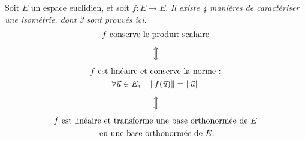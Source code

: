 \begin{thm}
	Soit $E$\/ un espace euclidien, et soit $f : E \to E$.
	\textsl{Il existe 4 manières de caractériser une isométrie, dont 3 sont prouvés ici.}
	\begin{gather*}
		f \text{ conserve le produit scalaire}\\[-2.5mm]
		\vrt\iff\\
		f \text{ est linéaire et conserve la norme :}\\
		\forall \vec{u} \in E, \quad \|f(\vec{u})\| = \|\vec{u}\|\\[-2.5mm]
		\vrt\iff\\
		f \text{ est linéaire et transforme une base orthonormée de $E$}\\
		\text{ en une base orthonormée de $E$.}
	\end{gather*}
\end{thm}

